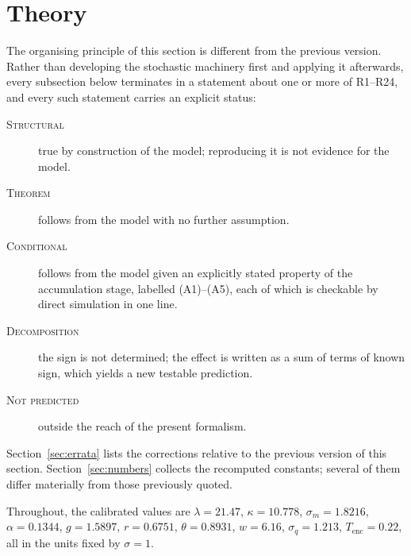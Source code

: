 \documentclass[11pt,a4paper]{article}
\newcommand{\E}{\mathbb{E}}
\newcommand{\Var}{\operatorname{Var}}
\newcommand{\Cov}{\operatorname{Cov}}
\newcommand{\dd}{\mathrm{d}}
\newcommand{\Tstop}{T_{\text{stop}}}
\newcommand{\Mrv}{M}
\newcommand{\icx}{\preceq_{\mathrm{icx}}}
\newcommand{\stle}{\preceq_{\mathrm{st}}}
\theoremstyle{plain}
\theoremstyle{remark}
\begin{document}

\section{Theory}
\label{sec:theory}

The organising principle of this section is different from the previous version.
Rather than developing the stochastic machinery first and applying it afterwards,
every subsection below terminates in a statement about one or more of R1--R24, and
every such statement carries an explicit status:

\begin{description}
\item[\textsc{Structural}] true by construction of the model; reproducing it is not
evidence for the model.
\item[\textsc{Theorem}] follows from the model with no further assumption.
\item[\textsc{Conditional}] follows from the model given an explicitly stated property of
the accumulation stage, labelled (A1)--(A5), each of which is checkable by direct
simulation in one line.
\item[\textsc{Decomposition}] the sign is not determined; the effect is written as a sum of
terms of known sign, which yields a new testable prediction.
\item[\textsc{Not predicted}] outside the reach of the present formalism.
\end{description}

Section~\ref{sec:errata} lists the corrections relative to the previous version of this
section. Section~\ref{sec:numbers} collects the recomputed constants; several of them
differ materially from those previously quoted.

Throughout, the calibrated values are $\lambda=21.47$, $\kappa=10.778$,
$\sigma_m=1.8216$, $\alpha=0.1344$, $g=1.5897$, $r=0.6751$, $\theta=0.8931$, $w=6.16$,
$\sigma_q=1.213$, $T_{\text{enc}}=0.22$, all in the units fixed by $\sigma=1$.
\end{document}
